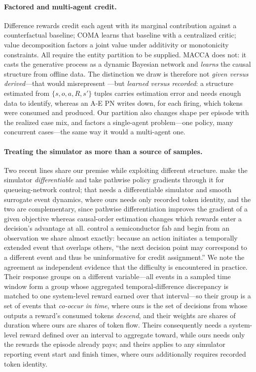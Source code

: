 \documentclass[review,authoryear,3p,times]{elsarticle}
\begin{document}
\paragraph{Factored and multi-agent credit.} Difference rewards
\citep{difference2002} credit each agent with its marginal contribution against
a counterfactual baseline; COMA \citep{coma2018} learns that baseline with a
centralized critic; value decomposition \citep{vdn2018,qmix2018} factors a joint
value under additivity or monotonicity constraints. All require the entity
partition to be supplied. MACCA \citep{macca2024} does not: it casts the
generative process as a dynamic Bayesian network and \emph{learns} the causal
structure from offline data. The distinction we draw is therefore not
\emph{given versus derived}---that would misrepresent \citet{macca2024}---but
\emph{learned versus recorded}: a structure estimated from $\{s,o,a,R,s'\}$
tuples carries estimation error and needs enough data to identify, whereas an
A-E PN writes down, for each firing, which tokens were consumed and produced.
Our partition also changes shape per episode with the realized case mix, and
factors a single-agent problem---one policy, many concurrent cases---the same
way it would a multi-agent one.

\paragraph{Treating the simulator as more than a source of samples.} Two recent
lines share our premise while exploiting different structure.
\citet{diffdes2024} make the simulator \emph{differentiable} and take pathwise
policy gradients through it for queueing-network control; that needs a
differentiable simulator and smooth surrogate event dynamics, where ours needs
only recorded token identity, and the two are complementary, since pathwise
differentiation improves the gradient of a given objective whereas causal-order
estimation changes which rewards enter a decision's advantage at all.
\citet{eventdriven2026} control a semiconductor fab and begin from an
observation we share almost exactly: because an action initiates a temporally
extended event that overlaps others, ``the next decision point may correspond to
a different event and thus be uninformative for credit assignment.'' We note the
agreement as independent evidence that the difficulty is encountered in
practice. Their response groups on a different variable---all events in a
sampled time window form a group whose aggregated temporal-difference
discrepancy is matched to one system-level reward earned over that
interval---so their group is a set of events that \emph{co-occur in time}, where
ours is the set of decisions from whose outputs a reward's consumed tokens
\emph{descend}, and their weights are shares of duration where ours are shares
of token flow. Theirs consequently needs a system-level reward defined over an
interval to aggregate toward, while ours needs only the rewards the episode
already pays; and theirs applies to any simulator reporting event start and
finish times, where ours additionally requires recorded token identity.
\end{document}
